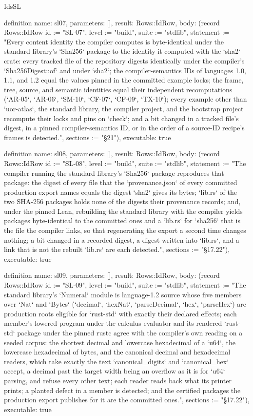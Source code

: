 \begin{lexlean}{IdsSL}
\begin{semanticmodule}
definition{
  name: sl07,
  parameters: [],
  result: Rows::IdRow,
  body: (record Rows::IdRow {id := "SL-07", level := "build", suite := "stdlib", statement := "Every content identity the compiler computes is byte-identical under the standard library's `Sha256` package to the identity it computed with the `sha2` crate: every tracked file of the repository digests identically under the compiler's `Sha256Digest::of` and under `sha2`; the compiler-semantics IDs of languages 1.0, 1.1, and 1.2 equal the values pinned in the committed example locks; the frame, tree, source, and semantic identities equal their independent recomputations (`AR-05`, `AR-06`, `SM-10`, `CF-07`, `CF-09`, `TX-10`); every example other than `uor-atlas`, the standard library, the compiler project, and the bootstrap project recompute their locks and pins on `check`; and a bit changed in a tracked file's digest, in a pinned compiler-semantics ID, or in the order of a source-ID recipe's frames is detected.", sections := "§21"}),
  executable: true
}

definition{
  name: sl08,
  parameters: [],
  result: Rows::IdRow,
  body: (record Rows::IdRow {id := "SL-08", level := "build", suite := "stdlib", statement := "The compiler running the standard library's `Sha256` package reproduces that package: the digest of every file that the `provenance.json` of every committed production export names equals the digest `sha2` gives its bytes; `lib.rs` of the two SHA-256 packages holds none of the digests their provenance records; and, under the pinned Lean, rebuilding the standard library with the compiler yields packages byte-identical to the committed ones and a `lib.rs` for `sha256` that is the file the compiler links, so that regenerating the export a second time changes nothing; a bit changed in a recorded digest, a digest written into `lib.rs`, and a link that is not the rebuilt `lib.rs` are each detected.", sections := "§17.22"}),
  executable: true
}

definition{
  name: sl09,
  parameters: [],
  result: Rows::IdRow,
  body: (record Rows::IdRow {id := "SL-09", level := "build", suite := "stdlib", statement := "The standard library's `Numeral` module is language-1.2 source whose five members over `Nat` and `Bytes` (`decimal`, `hexNat`, `parseDecimal`, `hex`, `parseHex`) are production roots eligible for `rust-std` with exactly their declared effects; each member's lowered program under the calculus evaluator and its rendered `rust-std` package under the pinned rustc agree with the compiler's own reading on a seeded corpus: the shortest decimal and lowercase hexadecimal of a `u64`, the lowercase hexadecimal of bytes, and the canonical decimal and hexadecimal readers, which take exactly the text `canonical_digits` and `canonical_hex` accept, a decimal past the target width being an overflow as it is for `u64` parsing, and refuse every other text; each reader reads back what its printer prints; a planted defect in a member is detected; and the certified packages the production export publishes for it are the committed ones.", sections := "§17.22"}),
  executable: true
}


\end{semanticmodule}
\end{lexlean}
